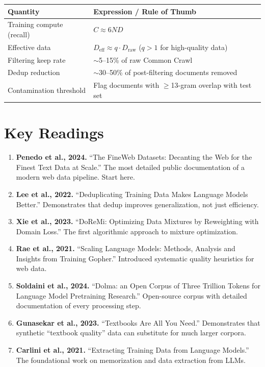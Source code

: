 \begin{center}
\begin{tabularx}{\textwidth}{@{}p{5cm}X@{}}
\toprule
\textbf{Quantity} & \textbf{Expression / Rule of Thumb} \\
\midrule
Training compute (recall) & $C \approx 6ND$ \\
Effective data & $D_{\text{eff}} \approx q \cdot D_{\text{raw}}$ \quad ($q > 1$ for high-quality data) \\
Filtering keep rate & $\sim$5--15\% of raw Common Crawl \\
Dedup reduction & $\sim$30--50\% of post-filtering documents removed \\
Contamination threshold & Flag documents with $\geq$13-gram overlap with test set \\
\bottomrule
\end{tabularx}
\end{center}


\section*{Key Readings}

\begin{enumerate}[nosep]
  \item \textbf{Penedo et al., 2024.} ``The FineWeb Datasets: Decanting the Web for the Finest Text Data at Scale.'' The most detailed public documentation of a modern web data pipeline. Start here.
  \item \textbf{Lee et al., 2022.} ``Deduplicating Training Data Makes Language Models Better.'' Demonstrates that dedup improves generalization, not just efficiency.
  \item \textbf{Xie et al., 2023.} ``DoReMi: Optimizing Data Mixtures by Reweighting with Domain Loss.'' The first algorithmic approach to mixture optimization.
  \item \textbf{Rae et al., 2021.} ``Scaling Language Models: Methods, Analysis and Insights from Training Gopher.'' Introduced systematic quality heuristics for web data.
  \item \textbf{Soldaini et al., 2024.} ``Dolma: an Open Corpus of Three Trillion Tokens for Language Model Pretraining Research.'' Open-source corpus with detailed documentation of every processing step.
  \item \textbf{Gunasekar et al., 2023.} ``Textbooks Are All You Need.'' Demonstrates that synthetic ``textbook quality'' data can substitute for much larger corpora.
  \item \textbf{Carlini et al., 2021.} ``Extracting Training Data from Language Models.'' The foundational work on memorization and data extraction from LLMs.
\end{enumerate}

\flushbottom
